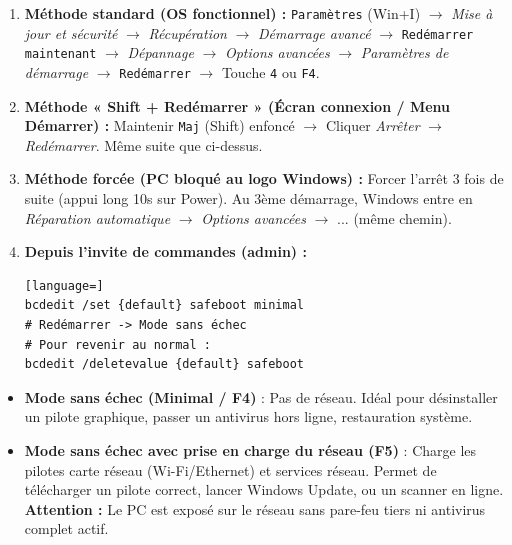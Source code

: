 \documentclass[11pt]{article}
\begin{document}
\begin{methode}
\begin{enumerate}
    \item \textbf{Méthode standard (OS fonctionnel) :} \texttt{Paramètres} (Win+I) $\rightarrow$ \emph{Mise à jour et sécurité} $\rightarrow$ \emph{Récupération} $\rightarrow$ \emph{Démarrage avancé} $\rightarrow$ \texttt{Redémarrer maintenant} $\rightarrow$ \emph{Dépannage} $\rightarrow$ \emph{Options avancées} $\rightarrow$ \emph{Paramètres de démarrage} $\rightarrow$ \texttt{Redémarrer} $\rightarrow$ Touche \texttt{4} ou \texttt{F4}.
    \item \textbf{Méthode « Shift + Redémarrer » (Écran connexion / Menu Démarrer) :} Maintenir \texttt{Maj} (Shift) enfoncé $\rightarrow$ Cliquer \emph{Arrêter} $\rightarrow$ \emph{Redémarrer}. Même suite que ci-dessus.
    \item \textbf{Méthode forcée (PC bloqué au logo Windows) :} Forcer l'arrêt 3 fois de suite (appui long 10s sur Power). Au 3ème démarrage, Windows entre en \emph{Réparation automatique} $\rightarrow$ \emph{Options avancées} $\rightarrow$ ... (même chemin).
    \item \textbf{Depuis l'invite de commandes (admin) :}
    \begin{lstlisting}[language=]
bcdedit /set {default} safeboot minimal
# Redémarrer -> Mode sans échec
# Pour revenir au normal :
bcdedit /deletevalue {default} safeboot
    \end{lstlisting}
\end{enumerate}
\end{methode}

\begin{attention}
\begin{itemize}
    \item \textbf{Mode sans échec (Minimal / F4)} : Pas de réseau. Idéal pour désinstaller un pilote graphique, passer un antivirus hors ligne, restauration système.
    \item \textbf{Mode sans échec avec prise en charge du réseau (F5)} : Charge les pilotes carte réseau (Wi-Fi/Ethernet) et services réseau. Permet de télécharger un pilote correct, lancer Windows Update, ou un scanner en ligne. \textbf{Attention :} Le PC est exposé sur le réseau sans pare-feu tiers ni antivirus complet actif.
\end{itemize}
\end{attention}
\end{document}
